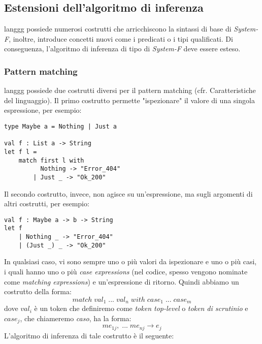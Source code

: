\documentclass[10pt,a4paper]{article}
\begin{document}
\subsection{Estensioni dell'algoritmo di inferenza}
langgg possiede numerosi costrutti che arricchiscono la sintassi di base di \textit{System-F}, inoltre, introduce
concetti nuovi come i predicati o i tipi qualificati. Di conseguenza, l'algoritmo di inferenza di tipo di \textit{System-F}
deve essere esteso.

\subsubsection{Pattern matching}
langgg possiede due costrutti diversi per il pattern matching (cfr. Caratteristiche del linguaggio). Il primo costrutto
permette "ispezionare" il valore di una singola espressione, per esempio:
\begin{lstlisting}
type Maybe a = Nothing | Just a

val f : List a -> String
let f l =
    match first l with
          Nothing -> "Error_404"
        | Just _ -> "Ok_200"
\end{lstlisting}
Il secondo costrutto, invece, non agisce su un'espressione, ma sugli argomenti di altri costrutti, per esempio:
\begin{lstlisting}
val f : Maybe a -> b -> String
let f
    | Nothing _ -> "Error_404"
    | (Just _) _ -> "Ok_200"
\end{lstlisting}
In qualsiasi caso, vi sono sempre uno o più valori da ispezionare e uno o più casi, i quali hanno uno o più \textit{case
expressions} (nel codice, spesso vengono nominate come \textit{matching expressions}) e un'espressione di ritorno.
Quindi abbiamo un costrutto della forma:
\[ match \; val_1 \; ... \; val_n \; with \; case_1 \; ... \; case_m \]
dove $ val_i $ è un token che definiremo come \textit{token top-level} o \textit{token di scrutinio} e
$ case_j $, che chiameremo \textit{caso}, ha la forma:
\[ me_{1j}, \; ... \; me_{nj} \rightarrow e_j \]
L'algoritmo di inferenza di tale costrutto è il seguente:
\end{document}
